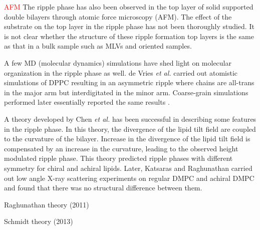\textcolor{red}{AFM}
The ripple phase has also been observed in the top layer of 
solid supported double bilayers through atomic force microscopy (AFM).
The effect of the substrate on the top layer in the ripple phase has not been
thoroughly studied. 
It is not clear whether the structure of these ripple formation top layers
is the same as that in a bulk sample such as MLVs and oriented samples.

A few MD (molecular dynamics) simulations have shed light on molecular 
organization in the ripple phase as well. 
de Vries \textit{et al.} \cite{ref:deVries05}
carried out atomistic simulations of DPPC resulting in an
asymmetric ripple where chains are all-trans in the major arm but
interdigitated in the minor arm. Coarse-grain
simulations performed later essentially reported the same results
\cite{ref:Lenz07}.

A theory developed by Chen \textit{et al.} \cite{ref:Chen95} has been 
successful in describing some features in the ripple phase. In this theory,
the divergence of the lipid tilt field are coupled to the curvature 
of the bilayer. Increase in the divergence of the lipid tilt field is compensated 
by an increase in the curvature, leading to the observed height modulated
ripple phase. This theory predicted ripple phases with different symmetry
for chiral and achiral lipids. Later, Katsaras and Raghunathan 
\cite{ref:Katsaras95} carried out low angle X-ray scattering experiments
on regular DMPC and achiral DMPC and found that there was no structural
difference between them. 

Raghunathan theory (2011)

Schmidt theory (2013)



